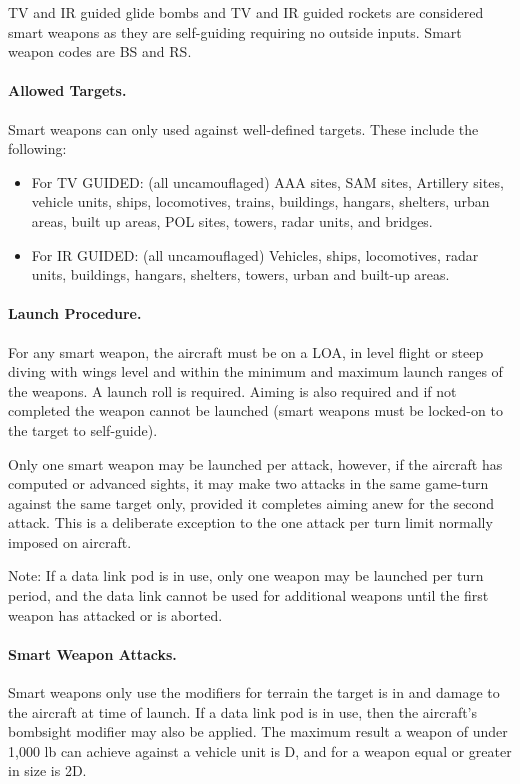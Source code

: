 

TV and IR guided glide bombs and TV and IR guided rockets are considered smart weapons as they are self-guiding requiring no outside inputs. Smart weapon codes are BS and RS.  

\paragraph{Allowed Targets.} Smart weapons can only used against well-defined targets. These include the following:

\begin{itemize}
    \item For TV GUIDED: (all uncamouflaged) AAA sites, SAM sites, Artillery sites, vehicle units, ships, locomotives, trains, buildings, hangars, shelters, urban areas, built up areas, POL sites, towers, radar units, and bridges.

    \item For IR GUIDED: (all uncamouflaged) Vehicles, ships, locomotives, radar units, buildings, hangars, shelters, towers, urban and built-up areas.
\end{itemize}

\paragraph{Launch Procedure.} For any smart weapon, the aircraft must be on a LOA, in level flight or steep diving with wings level and within the minimum and maximum launch ranges of the weapons. A launch roll is required. Aiming is also required and if not completed the weapon cannot be launched (smart weapons must be locked-on to the target to self-guide).

Only one smart weapon may be launched per attack, however, if the aircraft has computed or advanced sights, it may make two attacks in the same game-turn against the same target only, provided it completes aiming anew for the second attack. This is a deliberate exception to the one attack per turn limit normally imposed on aircraft.

Note: If a data link pod is in use, only one weapon may be launched per turn period, and the data link cannot be used for additional weapons until the first weapon has attacked or is aborted.

\paragraph{Smart Weapon Attacks.} Smart weapons only use the modifiers for terrain the target is in and damage to the aircraft at time of launch. If a data link pod is in use, then the aircraft's bombsight modifier may also be applied. The maximum result a weapon of under 1,000 lb can achieve against a vehicle unit is D, and for a weapon equal or greater in size is 2D.

